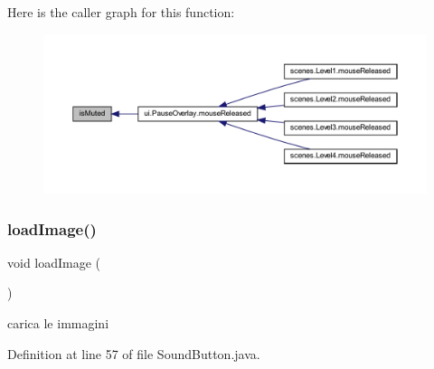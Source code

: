 Here is the caller graph for this function\+:\nopagebreak
\begin{figure}[H]
\begin{center}
\leavevmode
\includegraphics[width=350pt]{classui_1_1_sound_button_ab67171d139f4fbb66413cb6c42e83945_icgraph}
\end{center}
\end{figure}
\mbox{\label{classui_1_1_sound_button_aeee4cf1bbe51fdc2f9c344e4c20cee76}} 
\subsubsection{\texorpdfstring{load\+Image()}{loadImage()}}
{\footnotesize\ttfamily void load\+Image (\begin{DoxyParamCaption}{ }\end{DoxyParamCaption})\hspace{0.3cm}{\ttfamily [private]}}



carica le immagini 



Definition at line 57 of file Sound\+Button.\+java.

